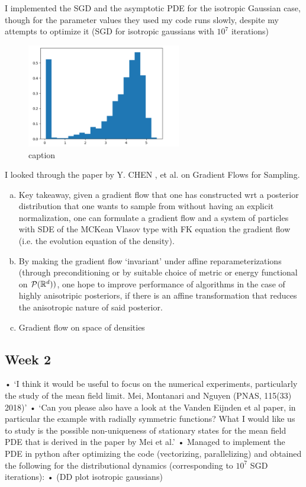 \documentclass{article}
\begin{document}
I implemented the SGD and the asymptotic PDE for the isotropic Gaussian case, though for the parameter values they used my code runs slowly, despite my attempts to optimize it 
(SGD for isotropic gaussians with $10^7$ iterations)
\begin{figure}[H]
    \centering
    \includegraphics[width = 0.6\textwidth]{images/Nguyen2018-SGD-1.png}
    \caption{ caption}
    \label{fig: label of figure}
\end{figure}
I looked through the paper by Y. CHEN , et al. \cite{chen2023gradientflowssamplingmeanfield} on Gradient Flows for Sampling. 
\begin{enumerate}[(a)]
    
	\item 	Key takeaway, given a gradient flow that one has constructed wrt a posterior distribution that one wants to sample from without having an explicit normalization, one can formulate a gradient flow and a system of particles with SDE of the MCKean Vlasov type with FK equation the gradient flow (i.e. the evolution equation of the density). 
	\item 	By making the gradient flow ‘invariant’ under affine reparameterizations (through preconditioning or by suitable choice of metric or energy functional on $\mathcal{P}(\mathbb{R}^d))$, one hope to improve performance of algorithms in the case of highly anisotripic posteriors, if there is an affine transformation that reduces the anisotropic nature of said posterior.
	\item 	Gradient flow on space of densities
\end{enumerate}


\subsection{Week 2}
•	‘I think it would be useful to focus on the numerical experiments, particularly the study of the mean field limit. Mei, Montanari and Nguyen (PNAS, 115(33) 2018)’
•	 ‘Can you please also have a look at the Vanden Eijnden et al paper, in particular the example with radially symmetric functions? What I would like us to study is the possible non-uniqueness of stationary states for the mean field PDE that is derived in the paper by Mei et al.’
•	Managed to implement the PDE in python after optimizing the code (vectorizing, parallelizing) and obtained the following for the distributional dynamics (corresponding to $10^7$ SGD iterations):
•	(DD plot isotropic gaussians)
\end{document}

